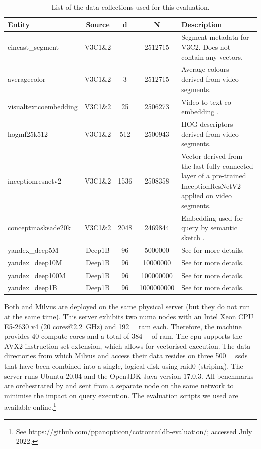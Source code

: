 \begin{table}
    \begin{tabular}{ | l | c | c | c | p{5cm} |}
        \hline
        \textbf{Entity} & \textbf{Source} & \textbf{d} & \textbf{N} & \textbf{Description} \\
        \hline
        \hline
        cineast\_segment & V3C1\&2  & - & 2512715 & Segment metadata for V3C2. Does not contain any vectors. \\ 
        \hline
        averagecolor & V3C1\&2  & 3 & 2512715 & Average colours derived from video segments. \\ 
        \hline
        visualtextcoembedding & V3C1\&2 & 25 & 2506273 & Video to text co-embedding \cite{Spiess:2021Competitive}. \\
        \hline
        hogmf25k512  & V3C1\&2  & 512 & 2500943 & HOG \cite{Bay:2006surf} descriptors derived from video segments. \\
        \hline
        inceptionresnetv2 & V3C1\&2  & 1536 & 2508358 & Vector derived from the last fully connected layer of a pre-trained InceptionResNetV2 applied on video segments.\\
        \hline
        conceptmasksade20k & V3C1\&2 & 2048 & 2469844 & Embedding used for query by semantic sketch \cite{Rossetto:2019Query}. \\
        \hline
        yandex\_deep5M  & Deep1B  & 96 & 5000000 & See \cite{Babenko:2016Efficient} for more details. \\
        \hline
        yandex\_deep10M  & Deep1B & 96 & 10000000 & See \cite{Babenko:2016Efficient} for more details. \\
        \hline
        yandex\_deep100M  & Deep1B & 96 & 100000000 & See \cite{Babenko:2016Efficient} for more details. \\
        \hline
        yandex\_deep1B  & Deep1B & 96 & 1000000000 & See \cite{Babenko:2016Efficient} for more details. \\
        \hline
        \hline
    \end{tabular}
    \caption{List of the data collections used for this evaluation.}
    \label{table:datasets}
\end{table}

Both \cottontail{} and Milvus are deployed on the same physical server (but they do not run at the same time). This server exhibits two \acrshort{numa} nodes with an Intel Xeon CPU E5-2630 v4 (20 cores@\SI{2.2}{\giga\hertz}) and \SI{192}{\giga\byte} \acrshort{ram} each. Therefore, the machine provides 40 compute cores and a total of \SI{384}{\giga\byte} of \acrshort{ram}. The \acrshort{cpu} supports the AVX2 instruction set extension, which allows for vectorised execution. The data directories from which Milvus and \cottontail{} access their data resides on three \SI{500}{\giga\byte} \acrshort{ssd}s that have been combined into a single, logical disk using \acrshort{raid}0 (striping). The server runs Ubuntu 20.04 and the OpenJDK Java version 17.0.3. All benchmarks are orchestrated by and sent from a separate node on the same network to minimise the impact on query execution. The evaluation scripts we used are available online.\footnote{See https://github.com/ppanopticon/cottontaildb-evaluation/; accessed July 2022.}

